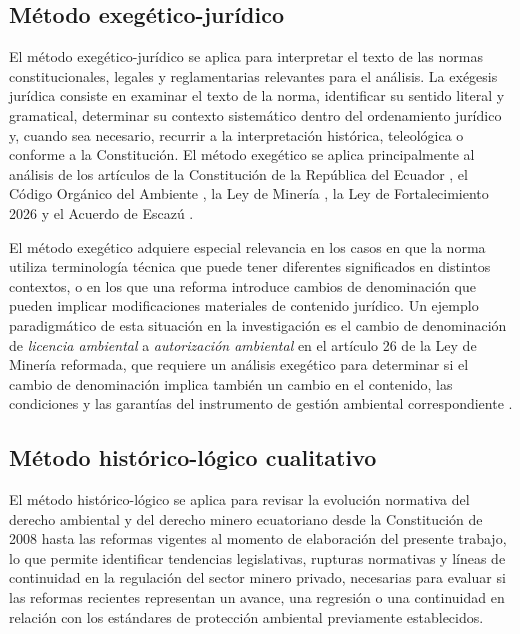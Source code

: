 \subsection{Método exegético-jurídico}

El método exegético-jurídico se aplica para interpretar el texto de las normas constitucionales, legales y reglamentarias relevantes para el análisis. La exégesis jurídica consiste en examinar el texto de la norma, identificar su sentido literal y gramatical, determinar su contexto sistemático dentro del ordenamiento jurídico y, cuando sea necesario, recurrir a la interpretación histórica, teleológica o conforme a la Constitución. El método exegético se aplica principalmente al análisis de los artículos de la Constitución de la República del Ecuador \parencite{cre_2008}, el Código Orgánico del Ambiente \parencite{coa_2017}, la Ley de Minería \parencite{ley_mineria_2025}, la Ley de Fortalecimiento 2026 \parencite{ley_fortalecimiento_2026} y el Acuerdo de Escazú \parencite{acuerdo_escazu_2018}.

El método exegético adquiere especial relevancia en los casos en que la norma utiliza terminología técnica que puede tener diferentes significados en distintos contextos, o en los que una reforma introduce cambios de denominación que pueden implicar modificaciones materiales de contenido jurídico. Un ejemplo paradigmático de esta situación en la investigación es el cambio de denominación de \textit{licencia ambiental} a \textit{autorización ambiental} en el artículo 26 de la Ley de Minería reformada, que requiere un análisis exegético para determinar si el cambio de denominación implica también un cambio en el contenido, las condiciones y las garantías del instrumento de gestión ambiental correspondiente \parencite{coa_2017,ley_fortalecimiento_2026}.

\subsection{Método histórico-lógico cualitativo}

El método histórico-lógico se aplica para revisar la evolución normativa del derecho ambiental y del derecho minero ecuatoriano desde la Constitución de 2008 hasta las reformas vigentes al momento de elaboración del presente trabajo, lo que permite identificar tendencias legislativas, rupturas normativas y líneas de continuidad en la regulación del sector minero privado, necesarias para evaluar si las reformas recientes representan un avance, una regresión o una continuidad en relación con los estándares de protección ambiental previamente establecidos.

